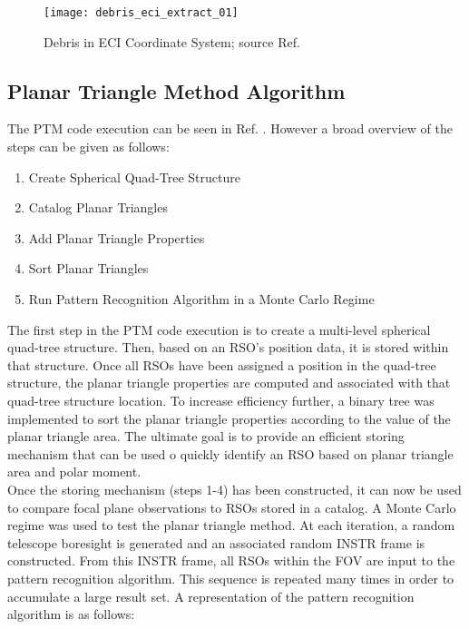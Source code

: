 \documentclass[]{aiaa-tc}%
\begin{document}
\begin{figure}[h]
\centering
\texttt{[image: debris\_eci\_extract\_01]}
\caption{Debris in ECI Coordinate System; source Ref.}
\label{ECIDebris_1}
\end{figure}

\subsection{Planar Triangle Method Algorithm}

The PTM code execution can be seen in Ref. . However  a broad overview of the steps can be given as follows:

\begin{enumerate}
\item Create Spherical Quad-Tree Structure
\item Catalog Planar Triangles
\item Add Planar Triangle Properties
\item Sort Planar Triangles
\item Run Pattern Recognition Algorithm in a Monte Carlo Regime
\end{enumerate}

The first step in the PTM code execution is to create a multi-level spherical quad-tree structure. Then, based on an RSO's position data, it is stored within that
structure. Once all RSOs have been assigned a position in the quad-tree structure, the planar
triangle properties are computed and associated with that quad-tree structure location. To increase
efficiency further, a binary tree was implemented to sort the planar triangle properties according to
the value of the planar triangle area. The ultimate goal is to provide an efficient storing mechanism that can be used o quickly identify an RSO based on planar triangle area and polar moment.\\

Once the storing mechanism (steps 1-4) has been constructed, it can now be used to compare focal plane observations to RSOs stored in a catalog. A Monte Carlo regime was used to test the planar triangle method. At each iteration, a random telescope boresight is generated and an associated random INSTR frame is constructed. From this INSTR frame, all RSOs within the FOV are input to the pattern recognition algorithm. This sequence is repeated many times in
order to accumulate a large result set. A representation of the pattern recognition algorithm is as follows:\\
\end{document}
